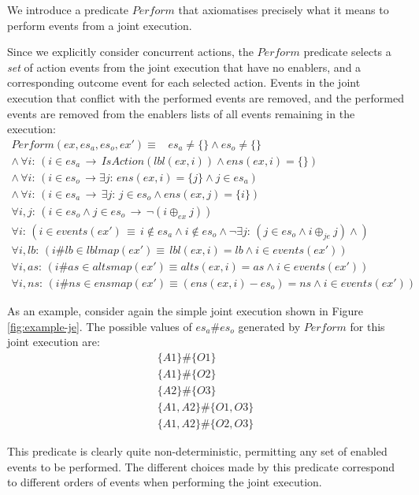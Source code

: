 We introduce a predicate $Perform$ that axiomatises precisely what
it means to perform events from a joint execution.

Since we explicitly consider concurrent actions, the $Perform$ predicate
selects a \emph{set} of action events from the joint execution that
have no enablers, and a corresponding outcome event for each selected
action. Events in the joint execution that conflict with the performed
events are removed, and the performed events are removed from the
enablers lists of all events remaining in the execution:\begin{gather*}
Perform(ex,es_{a},es_{o},ex')\equiv\,\,\,\,\, es_{a}\neq\{\}\wedge es_{o}\neq\{\}\\
\wedge\,\forall i:\,\left(i\in es_{a}\,\rightarrow\, IsAction(lbl(ex,i))\wedge ens(ex,i)=\{\}\right)\\
\wedge\,\forall i:\,\left(i\in es_{o}\,\rightarrow\exists j:\, ens(ex,i)=\{j\}\wedge j\in es_{a}\right)\\
\wedge\,\forall i:\,\left(i\in es_{a}\,\rightarrow\,\exists j:\, j\in es_{o}\wedge ens(ex,j)=\{i\}\right)\\
\forall i,j:\,\left(i\in es_{o}\wedge j\in es_{o}\,\rightarrow\,\neg(i\oplus_{ex}j)\right)\\
\forall i:\,\left(i\in events(ex')\,\equiv\, i\not\in es_{a}\wedge i\not\in es_{o}\wedge\neg\exists j:\,(j\in es_{o}\wedge i\oplus_{je}j)\wedge\right)\\
\forall i,lb:\,\left(i\#lb\in lblmap(ex')\equiv\, lbl(ex,i)=lb\wedge i\in events(ex')\right)\\
\forall i,as:\,\left(i\#as\in altsmap(ex')\equiv alts(ex,i)=as\wedge i\in events(ex')\right)\\
\forall i,ns:\,\left(i\#ns\in ensmap(ex')\equiv(ens(ex,i)-es_{o})=ns\wedge i\in events(ex')\right)\end{gather*}


As an example, consider again the simple joint execution shown in
Figure \ref{fig:example-je}. The possible values of $es_{a}\#es_{o}$
generated by $Perform$ for this joint execution are:\begin{gather*}
\{A1\}\#\{O1\}\\
\{A1\}\#\{O2\}\\
\{A2\}\#\{O3\}\\
\{A1,A2\}\#\{O1,O3\}\\
\{A1,A2\}\#\{O2,O3\}\end{gather*}


This predicate is clearly quite non-deterministic, permitting any
set of enabled events to be performed. The different choices made
by this predicate correspond to different orders of events when performing
the joint execution.



